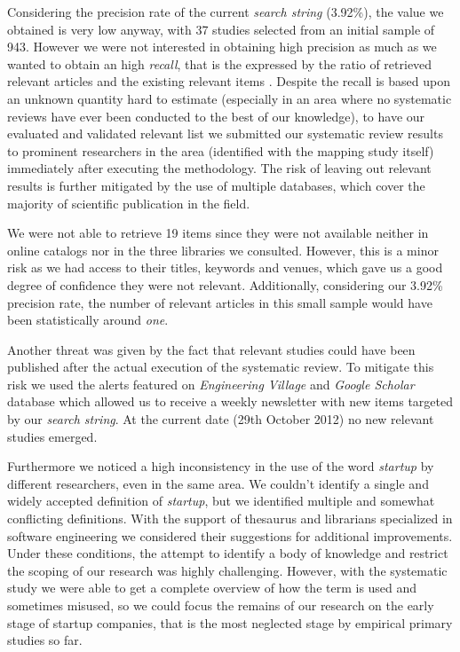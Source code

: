 \documentclass[final,5p,times,twocolumn]{elsarticle}
\begin{document}
Considering the precision rate of the current \textit{search string} (3.92\%), the value we obtained is very low anyway, with 37 studies selected from an initial sample of 943.  However we were not interested in obtaining high precision as much as we wanted to obtain an high \textit{recall}, that is the expressed by the ratio of retrieved relevant articles and the existing relevant items \cite{Saracevic1995}.  Despite the recall is based upon an unknown quantity hard to estimate (especially in an area where no systematic reviews have ever been conducted to the best of our knowledge), to have our evaluated and validated relevant list we submitted our systematic review results to prominent researchers in the area (identified with the mapping study itself) immediately after executing the methodology. The risk of leaving out relevant results is further mitigated by the use of multiple databases, which cover the majority of scientific publication in the field.

We were not able to retrieve 19 items since they were not available neither in online catalogs nor in the three libraries we consulted. However, this is a minor risk as we had access to their titles, keywords and venues, which gave us a good degree of confidence they were not relevant. Additionally, considering our 3.92\% precision rate, the number of relevant articles in this small sample would have been statistically around \textit{one}.

Another threat was given by the fact that relevant studies could have been published after the actual execution of the systematic review. To mitigate this risk we used the alerts featured on \textit{Engineering Village} and \textit{Google Scholar} database which allowed us to receive a weekly newsletter with new items targeted by our \textit{search string}. At the current date (29th October 2012) no new relevant studies emerged.

Furthermore we noticed a high inconsistency in the use of the word \textit{startup} by different researchers, even in the same area. We couldn’t identify a single and widely accepted definition of \textit{startup}, but we identified multiple and somewhat conflicting definitions. With the support of thesaurus and librarians specialized in software engineering we considered their suggestions for additional improvements.  Under these conditions, the attempt to identify a body of knowledge and restrict the scoping of our research was highly challenging. However, with the systematic study we were able to get a complete overview of how the term is used and sometimes misused, so we could focus the remains of our research on the early stage of startup companies, that is the most neglected stage by empirical primary studies so far.
\end{document}
